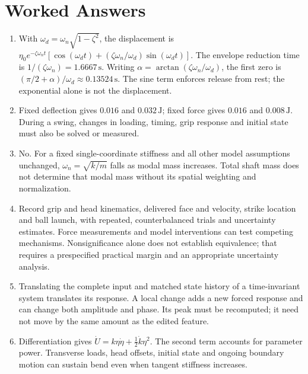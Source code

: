 \section{Worked Answers}
\begin{enumerate}
\item With $\omega_d=\omega_n\sqrt{1-\zeta^2}$, the displacement is $\eta_0e^{-\zeta\omega_nt}[\cos(\omega_dt)+(\zeta\omega_n/\omega_d)\sin(\omega_dt)]$. The envelope reduction time is $1/(\zeta\omega_n)=1.6667\,\mathrm s$. Writing $\alpha=\arctan(\zeta\omega_n/\omega_d)$, the first zero is $(\pi/2+\alpha)/\omega_d\approx0.13524\,\mathrm s$. The sine term enforces release from rest; the exponential alone is not the displacement.
\item Fixed deflection gives $0.016$ and $0.032\,\mathrm J$; fixed force gives $0.016$ and $0.008\,\mathrm J$. During a swing, changes in loading, timing, grip response and initial state must also be solved or measured.
\item No. For a fixed single-coordinate stiffness and all other model assumptions unchanged, $\omega_n=\sqrt{k/m}$ falls as modal mass increases. Total shaft mass does not determine that modal mass without its spatial weighting and normalization.
\item Record grip and head kinematics, delivered face and velocity, strike location and ball launch, with repeated, counterbalanced trials and uncertainty estimates. Force measurements and model interventions can test competing mechanisms. Nonsignificance alone does not establish equivalence; that requires a prespecified practical margin and an appropriate uncertainty analysis.
\item Translating the complete input and matched state history of a time-invariant system translates its response. A local change adds a new forced response and can change both amplitude and phase. Its peak must be recomputed; it need not move by the same amount as the edited feature.
\item Differentiation gives $\dot U=k\eta\dot\eta+\tfrac12\dot k\eta^2$. The second term accounts for parameter power. Transverse loads, head offsets, initial state and ongoing boundary motion can sustain bend even when tangent stiffness increases.
\end{enumerate}
\clearpage
\flushbottom{}
